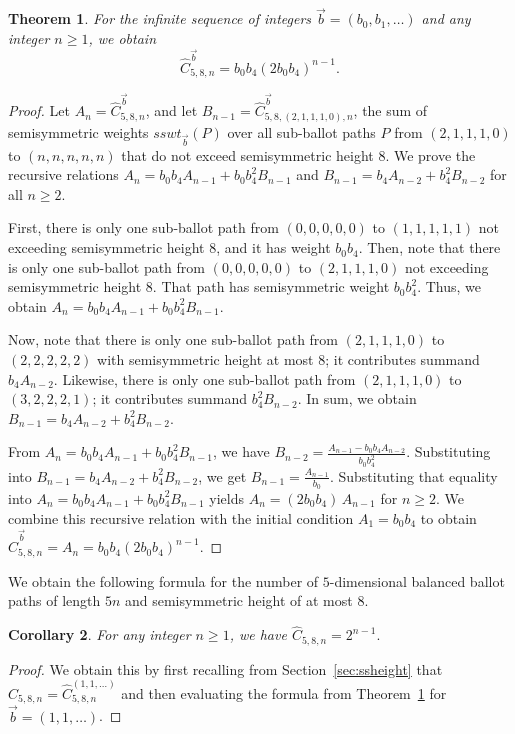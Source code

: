 \documentclass[11pt]{article}
\newtheorem{theorem}{Theorem}[section]
\newtheorem{corollary}[theorem]{Corollary}
\theoremstyle{remark}
\theoremstyle{definition}
\begin{document}
\begin{theorem}\label{thm:58}
    For the infinite sequence of integers $\vec{b} = (b_0, b_1, \dots)$ and any integer $n \geq 1$, we obtain
     $$\widehat{C}_{5,8,n}^{\vec{b}} = b_0b_4(2b_0b_4)^{n-1} .$$
\end{theorem}
\begin{proof}

 Let $A_n = \widehat{C}_{5, 8, n}^{\vec{b}}$, and let $B_{n-1}=\widehat{C}_{5, 8, (2,1, 1,1, 0), n}^{\vec{b}}$, the sum of semisymmetric weights $sswt_{\vec{b}}(P)$ over all sub-ballot paths $P$ from $(2, 1,1, 1, 0)$ to $(n, n, n,n,n)$ that do not exceed semisymmetric height $8$. We prove the recursive relations $A_n = b_0 b_4 A_{n-1}+b_0b_4^2B_{n-1}$ and $B_{n-1} = b_4 A_{n-2}+b_4^2 B_{n-2}$ for all $n \geq 2$.

  First, there is only one sub-ballot path from $(0, 0, 0, 0, 0)$ to $(1, 1, 1, 1, 1)$ not exceeding semisymmetric height $8$, and it has weight $b_0b_4$. Then, note that there is only one sub-ballot path from $(0, 0, 0, 0, 0)$ to $(2, 1, 1, 1, 0)$  not exceeding semisymmetric height $8$. That path has semisymmetric weight $b_0b_4^2$. Thus, we obtain $A_n = b_0b_4A_{n-1}+ b_0b_4^2B_{n-1}$.
  
  
  Now, note that there is only one sub-ballot path from $(2, 1, 1, 1, 0)$ to $(2, 2, 2, 2, 2)$ with semisymmetric height at most $8$; it contributes summand $b_4A_{n-2}$. Likewise, there is only one sub-ballot path from $(2, 1, 1, 1, 0)$ to $(3, 2, 2, 2, 1)$; it contributes summand $b_4^2B_{n-2}$. In sum, we obtain $B_{n-1} = b_4 A_{n-2}+b_4^2 B_{n-2}$.


From $A_n=b_0b_4A_{n-1}+b_0b_4^2B_{n-1}$, we have $B_{n-2} = \frac{A_{n-1}-b_0b_4A_{n-2}}{b_0b_4^2}$. Substituting into $B_{n-1} = b_4A_{n-2} + b_4^2B_{n-2}$, we get $B_{n-1} =  \frac{A_{n-1}}{b_0}$. Substituting that equality into $A_n=b_0b_4A_{n-1}+b_0b_4^2B_{n-1}$ yields $A_n = (2b_0b_4)\,A_{n-1}$ for $n \geq 2$.  We combine this recursive relation with the initial condition $A_1 = b_0b_4$ to obtain $\widehat{C}_{5, 8, n}^{\vec{b}} = A_n = b_0b_4 (2b_0b_4)^{n-1}$.
\end{proof}

We obtain the following formula for the number of $5$-dimensional balanced ballot paths of length $5n$ and semisymmetric height of at most $8$. 
\begin{corollary}
     For any integer $n \geq 1$, we have
    $\widehat{C}_{5, 8, n}= 2^{n-1}.$
\end{corollary}
\begin{proof}
    We obtain this by first recalling from Section~\ref{sec:ssheight} that $\widehat{C}_{5, 8, n} = \widehat{C}_{5, 8, n}^{(1, 1, \dots)}$ and then evaluating the formula from Theorem~\ref{thm:58} for $\vec{b} = (1, 1, \dots)$.
\end{proof}
\end{document}
